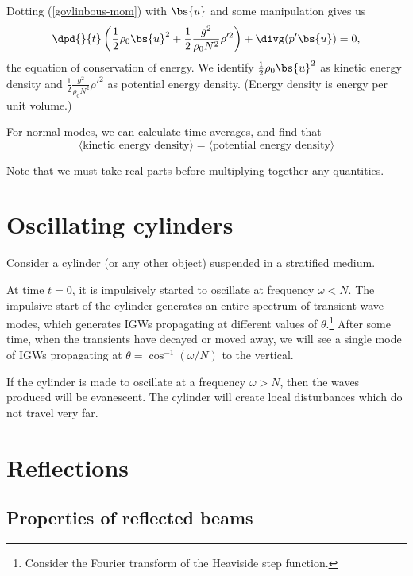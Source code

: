Dotting (\ref{govlinbous-mom}) with $\bs{u}$ and some manipulation gives us
\begin{equation}
	\dpd{}{t}\left(\frac{1}{2}\rho_0 \bs{u}^2 + \frac{1}{2}\frac{g^2}{\rho_0N^2}\rho'^2\right) + \divg(p'\bs{u}) = 0,
\end{equation}
the equation of conservation of energy. We identify $ \frac{1}{2}\rho_0 \bs{u}^2 $ as kinetic energy density and $\frac{1}{2}\frac{g^2}{\rho_0N^2}\rho'^2$ as potential energy density. (Energy density is energy per unit volume.)

For normal modes, we can calculate time-averages, and find that 
\begin{equation}
\langle\text{kinetic energy density}\rangle = \langle\text{potential energy density}\rangle
\end{equation}

Note that we must take real parts before multiplying together any quantities. 

\section{Oscillating cylinders}

Consider a cylinder (or any other object) suspended in a stratified medium.

At time $t=0$, it is impulsively started to oscillate at frequency $\omega<N$.
The impulsive start of the cylinder generates an entire spectrum of transient
wave modes, which generates IGWs propagating at different values of
$\theta$.\footnote{Consider the Fourier transform of the Heaviside step
function.} After some time, when the transients have decayed or moved away, we
will see a single mode of IGWs propagating at $\theta = \cos^{-1} (\omega/N)$ to
the vertical. 

If the cylinder is made to oscillate at a frequency $\omega > N$, then the waves
produced will be evanescent. The cylinder will create local disturbances which
do not travel very far.

\section{Reflections}
\subsection{Properties of reflected beams}

